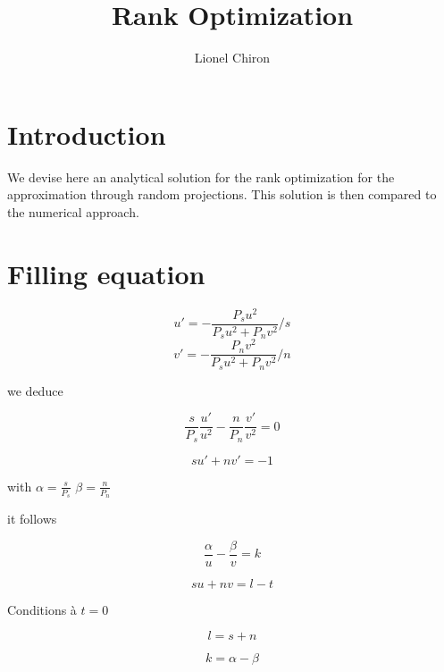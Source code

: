 \documentclass[a4paper]{article}
\title{Rank Optimization}
\author{Lionel Chiron}
\begin{document}
\maketitle



\section{Introduction}

We devise here an analytical solution for the rank optimization for the approximation through random projections.
This solution is then compared to the numerical approach.

\section{Filling equation}

\begin{equation}
      u'= -\frac{P_su^2}{P_su^2+P_nv^2}/s
\end{equation}
\begin{equation}
      v'= -\frac{P_nv^2}{P_su^2+P_nv^2}/n
\end{equation}

we deduce

\begin{equation}
     \frac{s}{P_s} \frac{u'}{u^2} - \frac{n}{P_n} \frac{v'}{v^2}= 0
\end{equation}

\begin{equation}
    s u' + n v' = -1
\end{equation}

with $ \alpha = \frac{s}{P_s} $
$ \beta = \frac{n}{P_n} $

it follows

\begin{equation}
    \frac{\alpha}{u} - \frac{\beta}{v} = k
\end{equation}

\begin{equation}
    s u + n v = l-t
\end{equation}

Conditions à $t=0$

\begin{equation}
    l= s+n
\end{equation}

\begin{equation}
    k = \alpha -\beta
\end{equation}
\end{document}
